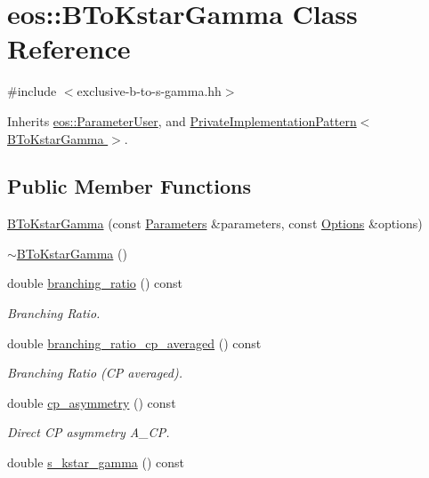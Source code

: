 \hypertarget{classeos_1_1BToKstarGamma}{
\section{eos::BToKstarGamma Class Reference}
\label{classeos_1_1BToKstarGamma}
}


{\ttfamily \#include $<$exclusive-\/b-\/to-\/s-\/gamma.hh$>$}

Inherits \hyperlink{classeos_1_1ParameterUser}{eos::ParameterUser}, and \hyperlink{classeos_1_1PrivateImplementationPattern}{PrivateImplementationPattern$<$ BToKstarGamma $>$}.\subsection*{Public Member Functions}
\begin{DoxyCompactItemize}
\item 
\hyperlink{classeos_1_1BToKstarGamma_a8d9742896eb27084656a59b2a9ba4b3f}{BToKstarGamma} (const \hyperlink{classeos_1_1Parameters}{Parameters} \&parameters, const \hyperlink{classeos_1_1Options}{Options} \&options)
\item 
\hyperlink{classeos_1_1BToKstarGamma_a9cb5e53e2bd12d0f3b87f02d0b780207}{$\sim$BToKstarGamma} ()
\item 
double \hyperlink{classeos_1_1BToKstarGamma_aeabd4759d56e4a1e6cd3f3df4b81fd1b}{branching\_\-ratio} () const 
\begin{DoxyCompactList}\small\item\em Branching Ratio. \item\end{DoxyCompactList}\item 
double \hyperlink{classeos_1_1BToKstarGamma_afc81c1b072b85980b3dea32b42f692fa}{branching\_\-ratio\_\-cp\_\-averaged} () const 
\begin{DoxyCompactList}\small\item\em Branching Ratio (CP averaged). \item\end{DoxyCompactList}\item 
double \hyperlink{classeos_1_1BToKstarGamma_aed1636a3d770081887c82800025bbda6}{cp\_\-asymmetry} () const 
\begin{DoxyCompactList}\small\item\em Direct CP asymmetry A\_\-CP. \item\end{DoxyCompactList}\item 
double \hyperlink{classeos_1_1BToKstarGamma_a36d453a167641d6f00c62d340fc4e81e}{s\_\-kstar\_\-gamma} () const 

\end{DoxyCompactItemize}
